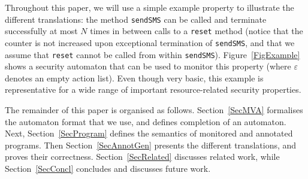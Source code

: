 Throughout this paper, we will use a simple example property to
illustrate the different translations: the method \texttt{sendSMS} can
be called and terminate successfully at most \(N\) times in between
calls to a \texttt{reset} method (notice that the counter is not
increased upon exceptional termination of
\texttt{sendSMS}, and that we assume that \texttt{reset} cannot be
called from within \texttt{sendSMS}). Figure~\ref{FigExample} shows a
security automaton that can be used to monitor this property (where
\(\varepsilon\) denotes an empty action list). Even though very basic,
this example is representative for a wide range of important
resource-related security properties.



The remainder of this paper is organised as
follows. Section~\ref{SecMVA} formalises the automaton format that we
use, and defines completion of an automaton. Next,
Section~\ref{SecProgram} defines the semantics of monitored and
annotated programs. Then Section~\ref{SecAnnotGen} presents the
different translations, and proves their
correctness. Section~\ref{SecRelated} discusses related work, while
Section~\ref{SecConcl} concludes and discusses future work.

